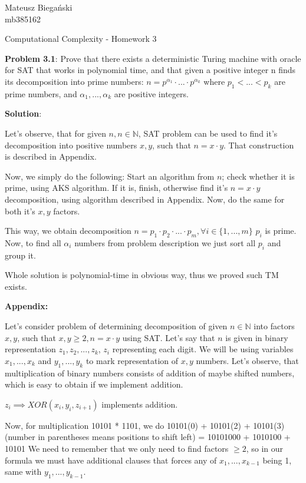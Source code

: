 \documentclass[12pt]{article}
\begin{document}

\begin{flushright}
    Mateusz Biegański \\ 
    mb385162
\end{flushright}

\begin{center}
    \Large Computational Complexity - Homework 3 \normalsize
\end{center}

\textbf{Problem 3.1}:
Prove that there exists a deterministic Turing machine with oracle for
SAT that works in polynomial time, and that given a positive integer n finds its decomposition into prime numbers:
$n = p^{\alpha_1} \cdot...\cdot p^{\alpha_k} $ where $p_1 < ... < p_k$ are prime numbers, and $\alpha_1,...,\alpha_k$ are positive integers.


{\bf Solution}:

Let's observe, that for given $n, n\in \mathbb{N}$, SAT problem can be used to find it's decomposition into positive numbers $x, y$, such that $n = x \cdot y$. That construction is described in Appendix.

Now, we simply do the following: 
Start an algorithm from $n$; check whether it is prime, using AKS algorithm. If it is, finish, otherwise find it's $n = x\cdot y$ decomposition, using algorithm described in Appendix. Now, do the same for both it's $x, y$ factors.

This way, we obtain decomposition $n = p_1 \cdot p_2 \cdot ... \cdot p_m, \forall{i \in \{1, ..., m\} }$ $p_i$ is prime. Now, to find all $\alpha_i$ numbers from problem description we just sort all $p_i$ and group it.

Whole solution is polynomial-time in obvious way, thus we proved such TM exists.


\textbf{Appendix:}

Let's consider problem of determining decomposition of given $n \in \mathbb{N}$ into factors $x,y$, such that $x, y \geq 2, n = x \cdot y$ using SAT. Let's say that $n$ is given in binary representation $z_1,z_2,...,z_k$, $z_i$ representing each digit. 
We will be using variables $x_1, ..., x_k$ and $y_1, ..., y_k$ to mark representation of $x, y$ numbers. Let's observe, that multiplication of binary numbers consists of addition of maybe shifted numbers, which is easy to obtain if we implement addition.

$z_i \implies XOR(x_i, y_i, z_{i+1})$ implements addition.

Now, for multiplication 10101 * 1101, we do
10101(0) + 10101(2) + 10101(3) (number in parentheses means positions to shift left)
= 10101000 + 1010100 + 10101
We need to remember that we only need to find factors $\geq 2$, so in our formula we must have additional clauses that forces any of $x_1, ..., x_{k-1}$ being 1, same with $y_1, ..., y_{k-1}$.
\end{document}
